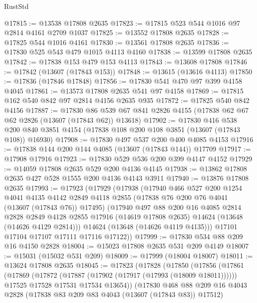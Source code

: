 \begin{lexlean}{RustStd}
\begin{coremodule}
@17815 := @13538 @17808 @2635
@17823 := @17815 @523 @544 @1016 @97 @2814 @4161 @2709 @1037
@17825 := @13552 @17808 @2635
@17828 := @17825 @544 @1016 @4161
@17830 := @13561 @17808 @2635
@17836 := @17830 @525 @543 @479 @1015 @4113 @4160
@17838 := @13599 @17808 @2635
@17842 := @17838 @153 @479 @153 @4113
@17843 := @13608 @17808
@17846 := @17842 (@13607 (@17843 @153))
@17848 := @13615 (@13616 @4113)
@17850 := @17836 (@17846 @17848)
@17856 := @17830 @541 @470 @97 @399 @4158 @4045
@17861 := @13573 @17808 @2635 @541 @97 @4158
@17869 := @17815 @162 @540 @842 @97 @2814 @4156 @2635 @935
@17872 := @17825 @540 @842 @4156
@17887 := @17830
    @86
    @539
    @67
    @841
    @2826
    @4155
    (@17838 @62 @67 @62 @2826 (@13607 (@17843 @62)) @13618)
@17902 := @17830
    @416
    @538
    @200
    @840
    @3851
    @4154
    (@17838 @108 @200 @108 @3851 (@13607 (@17843 @108)) @16930)
@17908 := @17830 @497 @537 @200 @400 @4085 @4153
@17916 := @17838 @144 @200 @144 @4085 (@13607 (@17843 @144)) @17709
@17917 := @17908 @17916
@17923 := @17830 @529 @536 @200 @399 @4147 @4152
@17929 := @14059 @17808 @2635 @529 @200 @4136 @4145
@17938 := @13862 @17808 @2635 @427 @528 @1555 @200 @4136 @4143 @3911
@17940 := @13876 @17808 @2635
@17993 := @17923
    (@17929
      (@17938
        (@17940
          @466
          @527
          @200
          @1254
          @4041
          @4135
          @4142
          @2849
          @4118
          @2855
          (@17838 @76 @200 @76 @4041 (@13607 (@17843 @76)) @17495)
          (@17940
            @497
            @88
            @200
            @16
            @4085
            @2814
            @2828
            @2849
            @4128
            @2855
            @17916
            (@14619 @17808 @2635)
            @14624
            (@13648 (@14626 @4129 @2814)))
          @14624
          (@13648 (@14626 @4119 @4135)))
        @17101
        @17104
        @17107
        @17111
        @17116
        @17122))
@17999 := @17830 @534 @88 @209 @16 @4150 @2828
@18004 := @15023 @17808 @2635 @531 @209 @4149
@18007 := @15031 (@15032 @531 @209)
@18009 := @17999 (@18004 @18007)
@18011 := @13624 @17808 @2635
@18045 := @17823
    (@17828
      (@17850
        (@17856
          (@17861
            (@17869
              (@17872 (@17887 (@17902 (@17917 (@17993 (@18009 @18011))))))
              @17525
              @17528
              @17531
              @17534
              @13654))
          (@17830
            @468
            @88
            @209
            @16
            @4043
            @2828
            (@17838 @83 @209 @83 @4043 (@13607 (@17843 @83)) @17512)

\end{coremodule}
\end{lexlean}
